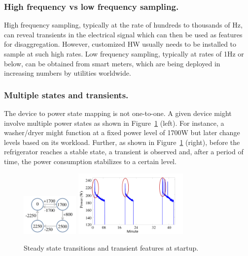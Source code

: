 \subsubsection*{High frequency vs low frequency sampling.}
High frequency sampling, typically at the rate of hundreds to thousands of
Hz, can reveal transients in the electrical signal which can then be used as
features for disaggregation. However, customized HW usually needs to be
installed to sample at such high rates.
Low frequency sampling, typically at rates of 1Hz or below, can be obtained
from smart meters, which are being deployed in increasing numbers by utilities
worldwide.

\subsubsection*{Multiple states and transients.}
The device to power state mapping is not one-to-one.
A given device might involve multiple power states
as shown in Figure~\ref{fig_sample} (left).
For instance, a washer/dryer might function at a fixed power level of
1700W but later change levels based on its workload.
Further,
as shown in Figure~\ref{fig_sample} (right), before the refrigerator reaches a
stable state, a transient is observed and,
after a period of time, the power consumption stabilizes to a certain level.

\begin{figure}[!hbp]
\centering
\includegraphics[width=0.25\textwidth]{disaggfigs/washdryer.pdf}
\includegraphics[width=0.5\textwidth]{disaggfigs/refrigerator.pdf}
\caption{Steady state transitions and transient features at startup.}
\label{fig_sample}
\end{figure}


